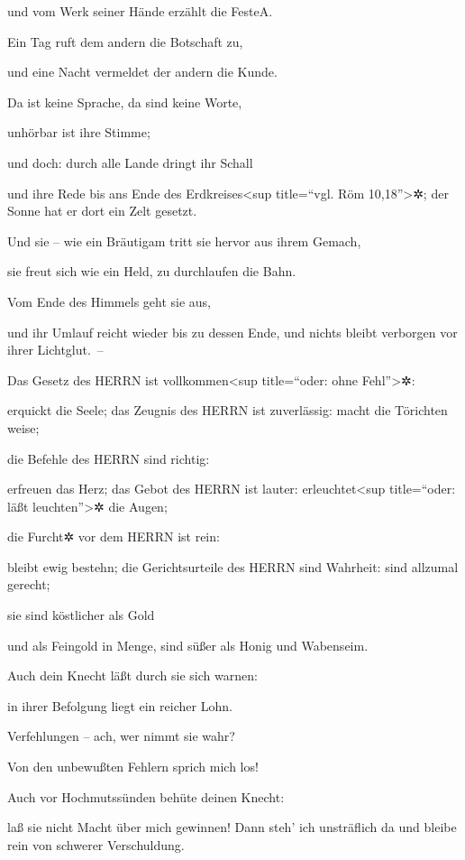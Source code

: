 und vom Werk seiner Hände erzählt die Feste{A}.

Ein Tag ruft dem andern die Botschaft zu,

und eine Nacht vermeldet der andern die Kunde.

Da ist keine Sprache, da sind keine Worte,

unhörbar ist ihre Stimme;

und doch: durch alle Lande dringt ihr Schall

und ihre Rede bis ans Ende des Erdkreises\textless sup title=``vgl. Röm
10,18''\textgreater✲; der Sonne hat er dort ein Zelt gesetzt.

Und sie -- wie ein Bräutigam tritt sie hervor aus ihrem
Gemach,

sie freut sich wie ein Held, zu durchlaufen die Bahn.

Vom Ende des Himmels geht sie aus,

und ihr Umlauf reicht wieder bis zu dessen Ende, und nichts bleibt
verborgen vor ihrer Lichtglut.~--

Das Gesetz des HERRN ist vollkommen\textless sup
title=``oder: ohne Fehl''\textgreater✲:

erquickt die Seele; das Zeugnis des HERRN ist zuverlässig: macht die
Törichten weise;

die Befehle des HERRN sind richtig:

erfreuen das Herz; das Gebot des HERRN ist lauter:
erleuchtet\textless sup title=``oder: läßt leuchten''\textgreater✲ die
Augen;

die Furcht✲ vor dem HERRN ist rein:

bleibt ewig bestehn; die Gerichtsurteile des HERRN sind Wahrheit: sind
allzumal gerecht;

sie sind köstlicher als Gold

und als Feingold in Menge, sind süßer als Honig und Wabenseim.

Auch dein Knecht läßt durch sie sich warnen:

in ihrer Befolgung liegt ein reicher Lohn.

Verfehlungen -- ach, wer nimmt sie wahr?

Von den unbewußten Fehlern sprich mich los!

Auch vor Hochmutssünden behüte deinen Knecht:

laß sie nicht Macht über mich gewinnen! Dann steh' ich unsträflich da
und bleibe rein von schwerer Verschuldung.

